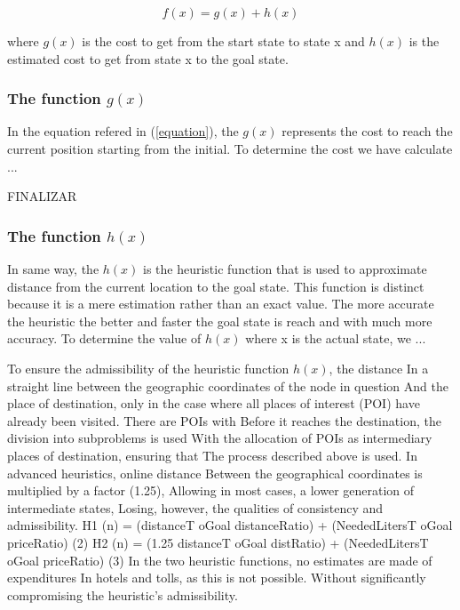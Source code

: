 \documentclass[a4paper]{article}
\begin{document}
\begin{equation}\label{equation}
f(x) = g(x) + h(x)
\end{equation}

where $g(x)$ is the cost to get from the start state to state x and $h(x)$ is the estimated cost to get from state x to the goal state.

\subsubsection{The function $g(x)$}\label{cost_function}

In the equation refered in (\ref{equation}), the $g(x)$ represents the cost to reach the current position starting from the initial. 
To determine the cost we have calculate ... 

FINALIZAR

\subsubsection{The function $h(x)$}\label{heuristic_function}

In same way, the $h(x)$ is the heuristic function that is used to approximate distance from the current location to the goal state. This function is distinct because it is a mere estimation rather than an exact value. The more accurate the heuristic the better and faster the goal state is reach and with much more accuracy.
To determine the value of $h(x)$ where x is the actual state, we ...

To ensure the admissibility of the heuristic function $h(x)$, the distance
In a straight line between the geographic coordinates of the node in question
And the place of destination, only in the case where all places of interest
(POI) have already been visited. There are POIs with
Before it reaches the destination, the division into subproblems is used
With the allocation of POIs as intermediary places of destination, ensuring that The process described above is used. In advanced heuristics, online distance Between the geographical coordinates is multiplied by a factor (1.25),
Allowing in most cases, a lower generation of intermediate states,
Losing, however, the qualities of consistency and admissibility.
H1 (n) = (distanceT oGoal distanceRatio) +
(NeededLitersT oGoal priceRatio) (2)
H2 (n) = (1.25 distanceT oGoal distRatio) +
(NeededLitersT oGoal priceRatio) (3)
In the two heuristic functions, no estimates are made of expenditures
In hotels and tolls, as this is not possible.
Without significantly compromising the heuristic's admissibility.
\end{document}
